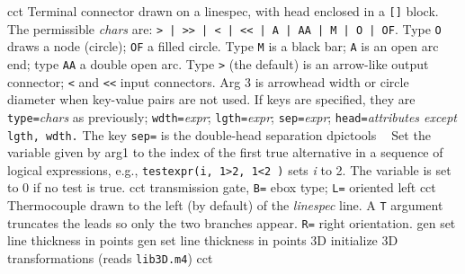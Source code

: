 %
  {cct}%
  {Terminal connector drawn on a linespec, with head enclosed in a {\tt []}%
   block.  The permissible {\sl chars} are:
   {\tt > | >{}> | < | <{}< | A | AA | M | O | OF}.
   Type {\tt O} draws a node (circle); {\tt OF} a filled circle.
   Type {\tt M} is a black bar; {\tt A} is an open arc end; type {\tt AA}%
   a double open arc.  Type {\tt >} (the default) is an arrow-like output
   connector; {\tt <} and {\tt <<} input connectors.  Arg 3 is arrowhead
   width or circle diameter when key-value pairs are not used.
   If keys are specified, they are {\tt type=}{\sl chars} as previously;
   {\tt wdth=}{\sl expr}; {\tt lgth=}{\sl expr}; {\tt sep=}{\sl expr};
   {\tt head=}{\sl attributes except} {\tt lgth, wdth.}%
   The key {\tt sep=} is the double-head separation
    }%
%
  {dpictools}%
  {$\;\;$ Set the variable given by arg1 to the index of the first true
  alternative in a sequence of logical expressions, e.g.,
  {\tt testexpr(i, 1>2, 1<2 )} sets {\sl i} to 2. The variable is set to 0
   if no test is true.}%
%
  {cct}%
  {transmission gate, {\tt B=} ebox type; {\tt L=} oriented left
    }%
%
  {cct}%
  { Thermocouple drawn to the left (by default) of the
    {\sl linespec} line.  A {\tt T} argument truncates the leads so
    only the two branches appear.  {\tt R=}%
    right orientation.  }%
%
  {gen}%
  {set line thickness in points}%
%
  {gen}%
  {set line thickness in points}%
%
  {3D} {initialize 3D transformations (reads {\tt lib3D.m4})}%
%
  {cct}%
